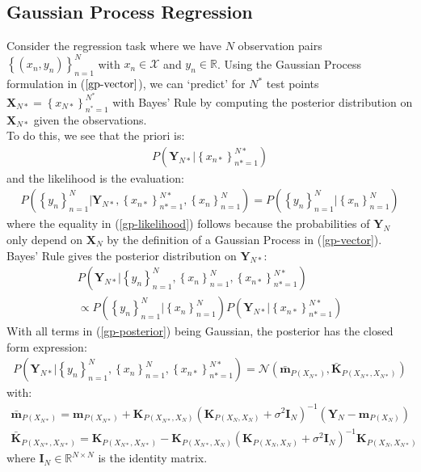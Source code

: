 \documentclass[twoside,11pt]{article}
\begin{document}
\subsection{Gaussian Process Regression \cite{wild2023connections}}
Consider the regression task where we have $N$ observation pairs $\left\{(x_n, y_n)\right\}_{n=1}^N$ with $x_n \in \mathcal{X}$ and $y_n \in \mathbb{R}$. Using the Gaussian Process formulation in ($\ref{gp-vector}$), we can `predict' for $N^*$ test points $\mathbf{X}_{N*} = \left\{ x_{N*}\right\}_{n^*=1}^{N^*}$ with Bayes' Rule by computing the posterior distribution on $\mathbf{X}_{N*}$ given the observations.
\\To do this, we see that the priori is:
\begin{align}
    \label{gp-prior}
    P\left(\mathbf{Y}_{N*} \big\vert \left\{ x_{n*}\right\}_{n*=1}^{N*}\right)
\end{align}
and the likelihood is the evaluation:
\begin{align}
     \label{gp-likelihood}
    P\left(\left\{ y_n\right\}_{n=1}^N \big\vert \mathbf{Y}_{N*}, \left\{ x_{n*}\right\}_{n*=1}^{N*}, \left\{ x_n\right\}_{n=1}^N \right) =P\left(\left\{ y_n\right\}_{n=1}^N \big\vert  \left\{ x_n\right\}_{n=1}^N\right)
\end{align}
where the equality in (\ref{gp-likelihood}) follows because the probabilities of $\mathbf{Y}_N$ only depend on $\mathbf{X}_N$ by the definition of a Gaussian Process in (\ref{gp-vector}).
\\Bayes' Rule gives the posterior distribution on $\mathbf{Y}_{N*}$:
\begin{multline}
     P\left(\mathbf{Y}_{N*} | \left\{ y_n\right\}_{n=1}^N,  \left\{ x_n\right\}_{n=1}^N,  \left\{ x_{n*}\right\}_{n*=1}^{N*}\right) 
     \\\propto P\left(\left\{ y_n\right\}_{n=1}^N \big\vert \left\{ x_n\right\}_{n=1}^N\right) P\left(\mathbf{Y}_{N*} \big\vert  \left\{ x_{n*}\right\}_{n*=1}^{N*}\right)
    \label{gp-posterior}
\end{multline}
With all terms in (\ref{gp-posterior}) being Gaussian, the posterior has the closed form expression:
\begin{align}
    P\left(\mathbf{Y}_{N*} | \left\{ y_n\right\}_{n=1}^N,  \left\{ x_n\right\}_{n=1}^N,  \left\{ x_{n*}\right\}_{n*=1}^{N*}\right)  =  \mathcal{N}(\bar{\mathbf{m}}_{P(X_{N*})}, \bar{\mathbf{K}}_{P(X_{N*}, X_{N*})})
\end{align}
with:
\begin{align}
    \label{gp-posterior-mean}
    \bar{\mathbf{m}}_{P(X_{N*})} = \mathbf{m}_{P(X_{N*})} + \mathbf{K}_{P(X_{N*}, X_N)} \left( \mathbf{K}_{P(X_N, X_N)} + \sigma^2 \mathbf{I}_N\right)^{-1} \left( \mathbf{Y}_N - \mathbf{m}_{P(X_N)}\right)\\
    \label{gp-posterior-covariance}
    \bar{\mathbf{K}}_{P(X_{N*}, X_{N*})} = \mathbf{K}_{P(X_{N*}, X_{N*})} - \mathbf{K}_{P(X_{N*}, X_N)}\left( \mathbf{K}_{P(X_N, X_N)} + \sigma^2 \mathbf{I}_N\right)^{-1}\mathbf{K}_{P(X_N, X_{N*})}
\end{align}
where $\mathbf{I}_N \in \mathbb{R}^{N \times N}$ is the identity matrix.
\end{document}
